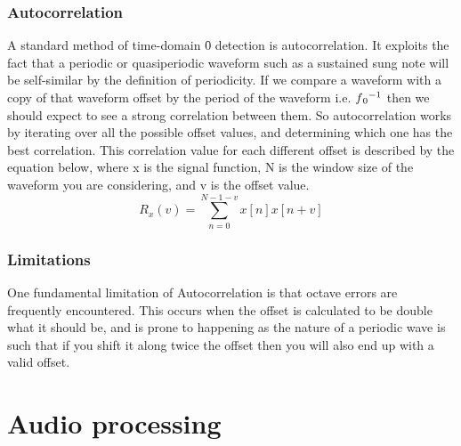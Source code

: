 		\subsubsection{Autocorrelation}
		A standard method of time-domain \f0 detection is autocorrelation. It exploits the fact that a periodic or quasiperiodic waveform such as a sustained sung note will be self-similar by the definition of periodicity. If we compare a waveform with a copy of that waveform offset by the period of the waveform i.e. \(\f0 ^{-1}\) then we should expect to see a strong correlation between them. So autocorrelation works by iterating over all the possible offset values, and determining which one has the best correlation. This correlation value for each different offset is described by the equation below, where x is the signal function, N is the window size of the waveform you are considering, and v is the offset value.  \[R_x(v) = \sum_{n=0}^{N-1-v} x[n]x[n+v]\]
		\subsubsection{Limitations}
		One fundamental limitation of Autocorrelation is that octave errors are frequently encountered. This occurs when the offset is calculated to be double what it should be, and is prone to happening as the nature of a periodic wave is such that if you shift it along twice the offset then you will also end up with a valid offset.
	
\section{Audio processing}


